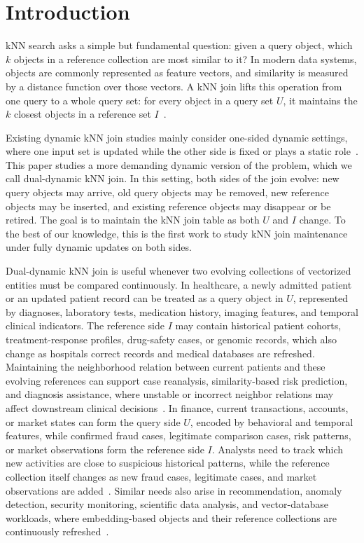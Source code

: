\section{Introduction}\label{sec:intro}

kNN search asks a simple but fundamental question: given a query object, which $k$ objects in a reference collection are most similar to it? In modern data systems, objects are commonly represented as feature vectors, and similarity is measured by a distance function over those vectors. A kNN join lifts this operation from one query to a whole query set: for every object in a query set $U$, it maintains the $k$ closest objects in a reference set $I$~\cite{bohm2003supporting,bohm2004k,xia2004gorder,yu2007efficient}.

Existing dynamic kNN join studies mainly consider one-sided dynamic settings, where one input set is updated while the other side is fixed or plays a static role~\cite{yang2014continuous,ukey2022efficient,ukey2023efficient,ukey2023knn}. This paper studies a more demanding dynamic version of the problem, which we call dual-dynamic kNN join. In this setting, both sides of the join evolve: new query objects may arrive, old query objects may be removed, new reference objects may be inserted, and existing reference objects may disappear or be retired. The goal is to maintain the kNN join table as both $U$ and $I$ change. To the best of our knowledge, this is the first work to study kNN join maintenance under fully dynamic updates on both sides.

Dual-dynamic kNN join is useful whenever two evolving collections of vectorized entities must be compared continuously. In healthcare, a newly admitted patient or an updated patient record can be treated as a query object in $U$, represented by diagnoses, laboratory tests, medication history, imaging features, and temporal clinical indicators. The reference side $I$ may contain historical patient cohorts, treatment-response profiles, drug-safety cases, or genomic records, which also change as hospitals correct records and medical databases are refreshed. Maintaining the neighborhood relation between current patients and these evolving references can support case reanalysis, similarity-based risk prediction, and diagnosis assistance, where unstable or incorrect neighbor relations may affect downstream clinical decisions~\cite{an2023comprehensive,fang2021patient,gottlieb2013method}. In finance, current transactions, accounts, or market states can form the query side $U$, encoded by behavioral and temporal features, while confirmed fraud cases, legitimate comparison cases, risk patterns, or market observations form the reference side $I$. Analysts need to track which new activities are close to suspicious historical patterns, while the reference collection itself changes as new fraud cases, legitimate cases, and market observations are added~\cite{al2021financial,immadisetty2025real,li2023artificial,gao2024machine}. Similar needs also arise in recommendation, anomaly detection, security monitoring, scientific data analysis, and vector-database workloads, where embedding-based objects and their reference collections are continuously refreshed~\cite{ahuja2019movie,tian2014anomaly,li2007network,wang2020log,pan2024survey}.

